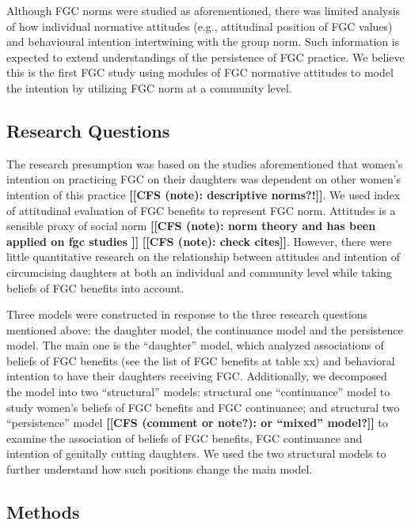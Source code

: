 \documentclass[12pt,]{article}
\newcommand{\comment}[1]{\textbf{[[#1]]}}
\newcommand{\cfonly}[1]{\comment{CFS (note): #1}}
\newcommand{\cf}[1]{\comment{CFS (comment or note?): #1}}
\begin{document}
Although FGC norms were studied as aforementioned, there was limited analysis of how individual normative attitudes (e.g., attitudinal position of FGC values) and behavioural intention intertwining with the group norm.  Such information is expected to extend understandings of the persistence of FGC practice.  We believe this is the first FGC study using modules of FGC normative attitudes to model the intention by utilizing FGC norm at a community level.

\subsection{Research Questions}\label{research-questions}

The research presumption was based on the studies aforementioned that women’s intention on practicing FGC on their daughters was dependent on other women’s intention of this practice \cfonly{descriptive norms?!}. We used index of attitudinal evaluation of FGC benefits to represent FGC norm.  Attitudes is a sensible proxy of social norm \cfonly {norm theory \cite{Ajze91, Ajze02, Bicc10, BiccMari15, Mack96, Mack00, MackLeJe08, RimaLapi15, Youn11} and has been applied on fgc studies \cite{CislHeis18, EffeVogt15, Harf06, ModrLiu13, PashPonn16, ShelHern06,}} \cfonly{check cites}.  However, there were little quantitative research on the relationship between attitudes and intention of circumcising daughters at both an individual and community level while taking beliefs of FGC benefits into account.

Three models were constructed in response to the three research questions mentioned above:  the daughter model, the continuance model and the persistence model.  The main one is the “daughter” model, which analyzed associations of beliefs of FGC benefits (see the list of FGC benefits at table xx) and behavioral intention to have their daughters receiving FGC.  Additionally, we decomposed the model into two “structural” models:  structural one “continuance” model to study women’s beliefs of FGC benefits and FGC continuance; and structural two “persistence”  model \cf{or “mixed” model?} to examine the association of beliefs of FGC benefits, FGC continuance and intention of genitally cutting daughters.  We used the two structural models to further understand how such positions change the main model.

\subsection{Methods}\label{methods}
\end{document}
